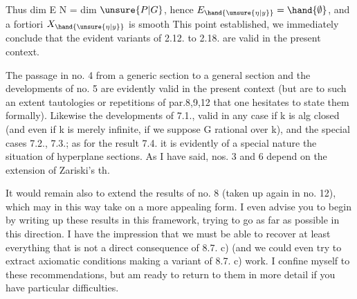 
Thus dim E \hand{$<$} N = dim $\unsure{P|G}$, hence $E_{\hand{\unsure{\eta|y}}} = \hand{\emptyset}$, and a fortiori $X_{\hand{\unsure{\eta|y}}}$ is smooth
This point established, we immediately conclude that the evident
variants of 2.12. to 2.18. are valid in the present context.

The passage in no. 4 from a generic section to a general section
and the developments of no. 5 are evidently valid in the present
context (but are to such an extent tautologies or repetitions of
par.8,9,12  that one hesitates to state them formally). Likewise the
developments of 7.1., valid in any case if k is  alg closed
(and even if k is merely infinite, if we suppose G rational over k),
and the special cases 7.2., 7.3.; as for the result 7.4. 
it is evidently  of a special nature   the situation of hyperplane
sections. As I have said, nos. 3 and 6 depend on the extension
of Zariski's th.

It would remain also to extend the results of no. 8 (taken up again in
no. 12), which may in this way take on a more appealing form.
I even advise you to begin by writing up these results in this framework,
trying to go as far as possible in this direction. I have
the impression that we must be able to recover at least everything that is not a
direct consequence of 8.7. c) (and we could even try
to extract axiomatic conditions making a variant of
8.7. c) work. I confine myself to these recommendations, but am ready to return to them
in more detail if you have particular difficulties.

